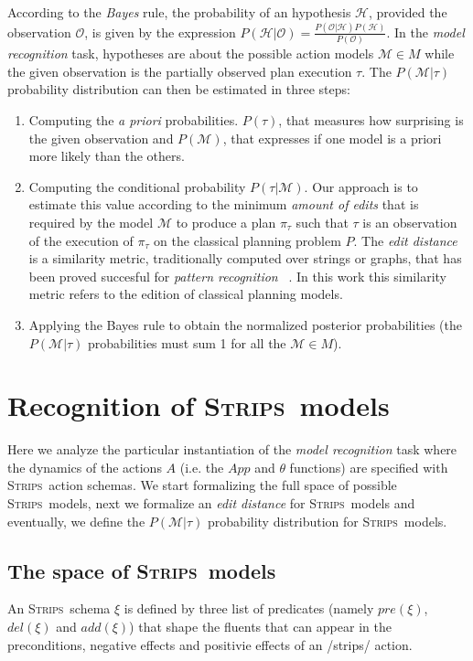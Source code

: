 \documentclass[letterpaper]{article} %
\newcommand{\strips}{\textsc{Strips}}     %
\begin{document}
According to the {\em Bayes} rule, the probability of an hypothesis $\mathcal{H}$, provided the observation $\mathcal{O}$, is given by the expression $P(\mathcal{H}|\mathcal{O})=\frac{P(\mathcal{O}|\mathcal{H})P(\mathcal{H})}{P(\mathcal{O})}$. In the {\em model recognition} task, hypotheses are about the possible action models $\mathcal{M}\in M$ while the given observation is the partially observed plan execution $\tau$. The $P(\mathcal{M}|\tau)$ probability distribution can then be estimated in three steps:
\begin{enumerate}
\item Computing the {\em a priori} probabilities. $P(\tau)$, that measures how surprising is the given observation and $P(\mathcal{M})$, that expresses if one model is a priori more likely than the others. 
\item Computing the conditional probability $P(\tau|\mathcal{M})$.  Our approach is to estimate this value according to the minimum {\em amount of edits} that is required by the model $\mathcal{M}$ to produce a plan $\pi_\tau$ such that $\tau$ is an observation of the execution of $\pi_\tau$ on the classical planning problem $P$. The {\em edit distance} is a similarity metric, traditionally computed over strings or graphs, that has been proved succesful for {\em pattern recognition} ~\cite{masek1980faster,bunke1997relation}. In this work this similarity metric refers to the edition of classical planning models. 
\item Applying the Bayes rule to obtain the normalized posterior probabilities (the $P(\mathcal{M}|\tau)$ probabilities must sum 1 for all the $\mathcal{M}\in M$).
\end{enumerate}



\section{Recognition of \strips\ models}
\label{sec:asPlanning}
Here we analyze the particular instantiation of the {\em model recognition} task where the dynamics of the actions $A$ (i.e. the $App$ and $\theta$ functions) are specified with \strips\ action schemas. We start formalizing the full space of possible \strips\ models, next we formalize an {\em edit distance} for \strips\ models and eventually, we define the $P(\mathcal{M}|\tau)$ probability distribution for \strips\ models.

\subsection{The space of \strips\ models}
An \strips\ schema $\xi$ is defined by three list of predicates (namely $pre(\xi)$, $del(\xi)$ and $add(\xi)$) that shape the fluents that can appear in the preconditions, negative effects and positivie effects of an /strips/ action.
\end{document}
